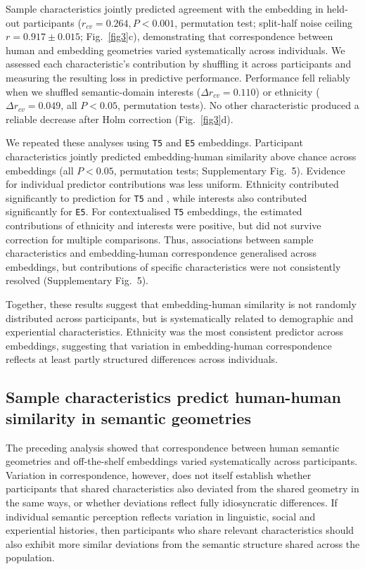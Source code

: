\documentclass[pdflatex,sn-mathphys]{sn-jnl}
\begin{document}
Sample characteristics jointly predicted agreement with the embedding in held-out participants ($r_{cv} = 0.264, P < 0.001$, permutation test; split-half noise ceiling $r = 0.917\pm0.015$; Fig.~\ref{fig3}c), demonstrating that correspondence between human and embedding geometries varied systematically across individuals. We assessed each characteristic's contribution by shuffling it across participants and measuring the resulting loss in predictive performance. Performance fell reliably when we shuffled semantic-domain interests ($\Delta r_{cv} = 0.110$) or ethnicity ($\Delta r_{cv} = 0.049$, all $P < 0.05$, permutation tests). No other characteristic produced a reliable decrease after Holm correction (Fig.~\ref{fig3}d). 

We repeated these analyses using \texttt{T5} and \texttt{E5} embeddings. Participant characteristics jointly predicted embedding-human similarity above chance across embeddings (all $P < 0.05$, permutation tests; Supplementary Fig.~5). Evidence for individual predictor contributions was less uniform. Ethnicity contributed significantly to prediction for \texttt{T5} and , while interests also contributed significantly for \texttt{E5}. For contextualised \texttt{T5} embeddings, the estimated contributions of ethnicity and interests were positive, but did not survive correction for multiple comparisons. Thus, associations between sample characteristics and embedding-human correspondence generalised across embeddings, but contributions of specific characteristics were not consistently resolved (Supplementary Fig.~5).

Together, these results suggest that embedding-human similarity is not randomly distributed across participants, but is systematically related to demographic and experiential characteristics. Ethnicity was the most consistent predictor across embeddings, suggesting that variation in embedding-human correspondence reflects at least partly structured differences across individuals.

\subsection{Sample characteristics predict human-human similarity in semantic geometries}
The preceding analysis showed that correspondence between human semantic geometries and off-the-shelf embeddings varied systematically across participants. Variation in correspondence, however, does not itself establish whether participants that shared characteristics also deviated from the shared geometry in the same ways, or whether deviations reflect fully idiosyncratic differences. If individual semantic perception reflects variation in linguistic, social and experiential histories, then participants who share relevant characteristics should also exhibit more similar deviations from the semantic structure shared across the population.
\end{document}
